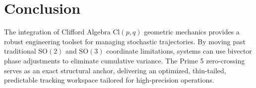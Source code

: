 \documentclass[11pt,fleqn]{article}
\begin{document}
\section{Conclusion}
The integration of Clifford Algebra $\text{Cl}(p,q)$ geometric mechanics provides a robust engineering toolset for managing stochastic trajectories. By moving past traditional $\text{SO}(2)$ and $\text{SO}(3)$ coordinate limitations, systems can use bivector phase adjustments to eliminate cumulative variance. The Prime 5 zero-crossing serves as an exact structural anchor, delivering an optimized, thin-tailed, predictable tracking workspace tailored for high-precision operations.
\end{document}
